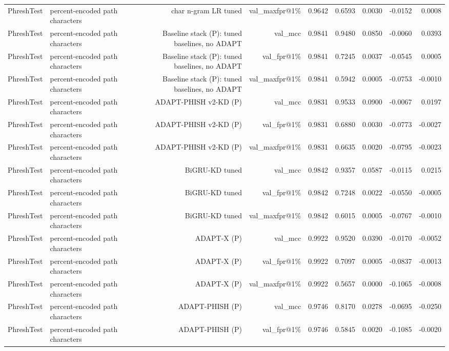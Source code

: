 \begin{table}[t]
\begin{tabular}{llrrrrrrr}
PhreshTest & percent-encoded path characters & char n-gram LR tuned & val\_maxfpr@1\% & 0.9642 & 0.6593 & 0.0030 & -0.0152 & 0.0008 \\
PhreshTest & percent-encoded path characters & Baseline stack (P): tuned baselines, no ADAPT & val\_mcc & 0.9841 & 0.9480 & 0.0850 & -0.0060 & 0.0393 \\
PhreshTest & percent-encoded path characters & Baseline stack (P): tuned baselines, no ADAPT & val\_fpr@1\% & 0.9841 & 0.7245 & 0.0037 & -0.0545 & 0.0005 \\
PhreshTest & percent-encoded path characters & Baseline stack (P): tuned baselines, no ADAPT & val\_maxfpr@1\% & 0.9841 & 0.5942 & 0.0005 & -0.0753 & -0.0010 \\
PhreshTest & percent-encoded path characters & ADAPT-PHISH v2-KD (P) & val\_mcc & 0.9831 & 0.9533 & 0.0900 & -0.0067 & 0.0197 \\
PhreshTest & percent-encoded path characters & ADAPT-PHISH v2-KD (P) & val\_fpr@1\% & 0.9831 & 0.6880 & 0.0030 & -0.0773 & -0.0027 \\
PhreshTest & percent-encoded path characters & ADAPT-PHISH v2-KD (P) & val\_maxfpr@1\% & 0.9831 & 0.6635 & 0.0020 & -0.0795 & -0.0023 \\
PhreshTest & percent-encoded path characters & BiGRU-KD tuned & val\_mcc & 0.9842 & 0.9357 & 0.0587 & -0.0115 & 0.0215 \\
PhreshTest & percent-encoded path characters & BiGRU-KD tuned & val\_fpr@1\% & 0.9842 & 0.7248 & 0.0022 & -0.0550 & -0.0005 \\
PhreshTest & percent-encoded path characters & BiGRU-KD tuned & val\_maxfpr@1\% & 0.9842 & 0.6015 & 0.0005 & -0.0767 & -0.0010 \\
PhreshTest & percent-encoded path characters & ADAPT-X (P) & val\_mcc & 0.9922 & 0.9520 & 0.0390 & -0.0170 & -0.0052 \\
PhreshTest & percent-encoded path characters & ADAPT-X (P) & val\_fpr@1\% & 0.9922 & 0.7097 & 0.0005 & -0.0837 & -0.0013 \\
PhreshTest & percent-encoded path characters & ADAPT-X (P) & val\_maxfpr@1\% & 0.9922 & 0.5657 & 0.0000 & -0.1065 & -0.0008 \\
PhreshTest & percent-encoded path characters & ADAPT-PHISH (P) & val\_mcc & 0.9746 & 0.8170 & 0.0278 & -0.0695 & -0.0250 \\
PhreshTest & percent-encoded path characters & ADAPT-PHISH (P) & val\_fpr@1\% & 0.9746 & 0.5845 & 0.0020 & -0.1085 & -0.0020 \\

\end{tabular}
\end{table}

